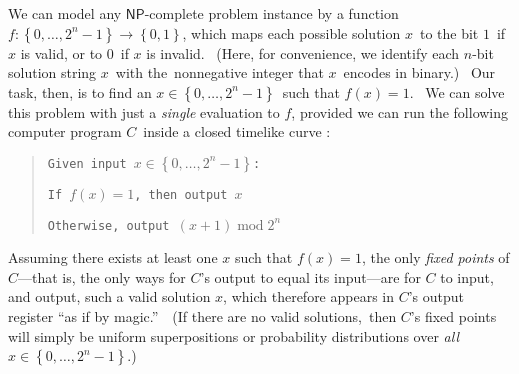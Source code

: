 \documentclass[11pt,onecolumn]{article}%
\begin{document}
We can model any $\mathsf{NP}$-complete problem instance by a function
$f:\left\{  0,\ldots,2^{n}-1\right\}  \rightarrow\left\{  0,1\right\}  $,
which maps each possible solution $x$\ to the bit $1$\ if $x$ is valid, or to
$0$\ if $x$ is invalid. \ (Here, for convenience, we identify each $n$-bit
solution string $x$\ with the\ nonnegative integer that $x$\ encodes in
binary.) \ Our task, then, is to find an $x\in\left\{  0,\ldots,2^{n}%
-1\right\}  $\ such that $f\left(  x\right)  =1$. \ We can solve this problem
with just a \textit{single} evaluation to $f$, provided we can run the
following computer program $C$\ inside a closed timelike curve
\cite{brun,aar:np,awat}:

\begin{quotation}
\texttt{Given input }$x\in\left\{  0,\ldots,2^{n}-1\right\}  $\texttt{:}

\texttt{If }$f\left(  x\right)  =1$\texttt{, then output }$x$

\texttt{Otherwise, output }$\left(  x+1\right)  \operatorname{mod}2^{n}$
\end{quotation}

Assuming there exists at least one $x$ such that $f\left(  x\right)  =1$, the
only \textit{fixed points} of $C$---that is, the only ways for $C$'s output to
equal its input---are for $C$ to input, and output, such a valid solution $x$,
which therefore appears in $C$'s output register \textquotedblleft as if by
magic.\textquotedblright\ \ (If there are no valid solutions,\ then $C$'s
fixed points will simply be uniform superpositions or probability
distributions over \textit{all} $x\in\left\{  0,\ldots,2^{n}-1\right\}  $.)
\end{document}

